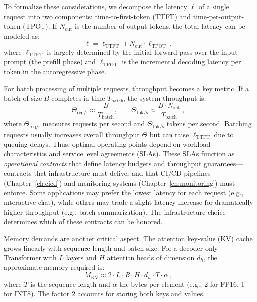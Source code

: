 To formalize these considerations, we decompose the latency $\ell$ of a single request into two components: time-to-first-token (TTFT) and time-per-output-token (TPOT). If $N_{\text{out}}$ is the number of output tokens, the total latency can be modeled as:
\begin{equation}
\ell = \ell_{\text{TTFT}} + N_{\text{out}} \cdot \ell_{\text{TPOT}} ~,
\label{eq:latency-infra}
\end{equation}
where $\ell_{\text{TTFT}}$ is largely determined by the initial forward pass over the input prompt (the prefill phase) and $\ell_{\text{TPOT}}$ is the incremental decoding latency per token in the autoregressive phase.

For batch processing of multiple requests, throughput becomes a key metric. If a batch of size $B$ completes in time $T_{\text{batch}}$, the system throughput is:
\begin{equation}
\Theta_{\text{req/s}} \approx \frac{B}{T_{\text{batch}}},
\qquad
\Theta_{\text{tok/s}} \approx \frac{B \cdot N_{\text{out}}}{T_{\text{batch}}} ~,
\label{eq:throughput-env}
\end{equation}
where $\Theta_{\text{req/s}}$ measures requests per second and $\Theta_{\text{tok/s}}$ tokens per second. Batching requests usually increases overall throughput $\Theta$ but can raise $\ell_{\text{TTFT}}$ due to queuing delays. Thus, optimal operating points depend on workload characteristics and service level agreements (SLAs). These SLAs function as \emph{operational contracts} that define latency budgets and throughput guarantees—contracts that infrastructure must deliver and that CI/CD pipelines (Chapter~\ref{ch:cicd}) and monitoring systems (Chapter~\ref{ch:monitoring}) must enforce. Some applications may prefer the lowest latency for each request (e.g., interactive chat), while others may trade a slight latency increase for dramatically higher throughput (e.g., batch summarization). The infrastructure choice determines which of these contracts can be honored.

Memory demands are another critical aspect. The attention key-value (KV) cache grows linearly with sequence length and batch size. For a decoder-only Transformer with $L$ layers and $H$ attention heads of dimension $d_h$, the approximate memory required is:
\begin{equation}
M_{\text{KV}} \approx 2 \cdot L \cdot B \cdot H \cdot d_h \cdot T \cdot \alpha ~,
\label{eq:kv-memory}
\end{equation}
where $T$ is the sequence length and $\alpha$ the bytes per element (e.g., 2 for FP16, 1 for INT8). The factor 2 accounts for storing both keys and values. 

